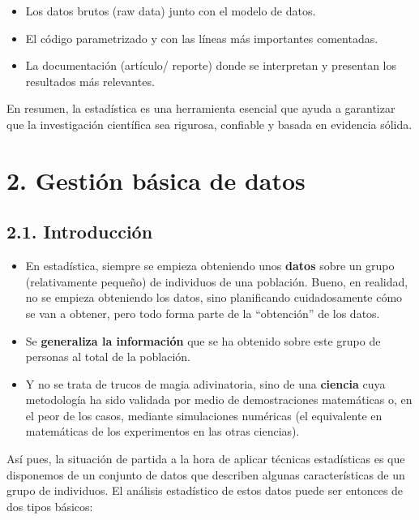\documentclass[
  letterpaper,
  DIV=11,
  numbers=noendperiod]{scrreprt}
\begin{document}
\begin{itemize}
  \begin{itemize}
  \item
    Los datos brutos (raw data) junto con el modelo de datos.
  \item
    El código parametrizado y con las líneas más importantes comentadas.
  \item
    La documentación (artículo/ reporte) donde se interpretan y
    presentan los resultados más relevantes.
  \end{itemize}
\end{itemize}

En resumen, la estadística es una herramienta esencial que ayuda a
garantizar que la investigación científica sea rigurosa, confiable y
basada en evidencia sólida.

\hypertarget{gestiuxf3n-buxe1sica-de-datos}{%
\section{2. Gestión básica de
datos}\label{gestiuxf3n-buxe1sica-de-datos}}

\hypertarget{introducciuxf3n}{%
\subsection{2.1. Introducción}\label{introducciuxf3n}}

\begin{itemize}
\item
  En estadística, siempre se empieza obteniendo unos \textbf{datos}
  sobre un grupo (relativamente pequeño) de individuos de una población.
  Bueno, en realidad, no se empieza obteniendo los datos, sino
  planificando cuidadosamente cómo se van a obtener, pero todo forma
  parte de la ``obtención'' de los datos.
\item
  Se \textbf{generaliza la información} que se ha obtenido sobre este
  grupo de personas al total de la población.
\item
  Y no se trata de trucos de magia adivinatoria, sino de una
  \textbf{ciencia} cuya metodología ha sido validada por medio de
  demostraciones matemáticas o, en el peor de los casos, mediante
  simulaciones numéricas (el equivalente en matemáticas de los
  experimentos en las otras ciencias).
\end{itemize}

Así pues, la situación de partida a la hora de aplicar técnicas
estadísticas es que disponemos de un conjunto de datos que describen
algunas características de un grupo de individuos. El análisis
estadístico de estos datos puede ser entonces de dos tipos básicos:
\end{document}
